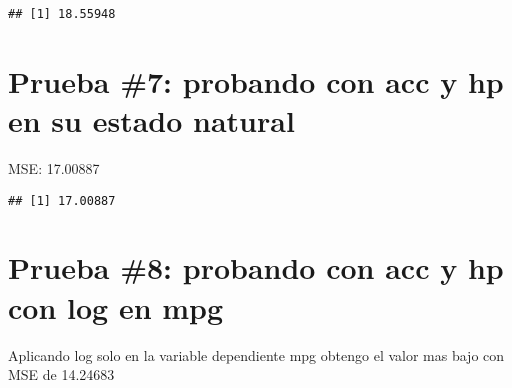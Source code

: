 \documentclass[]{article}
\newenvironment{Shaded}{\begin{snugshade}}{\end{snugshade}}
\newcommand{\CommentTok}[1]{\textcolor[rgb]{0.56,0.35,0.01}{\textit{#1}}}
\newcommand{\DataTypeTok}[1]{\textcolor[rgb]{0.13,0.29,0.53}{#1}}
\newcommand{\DecValTok}[1]{\textcolor[rgb]{0.00,0.00,0.81}{#1}}
\newcommand{\KeywordTok}[1]{\textcolor[rgb]{0.13,0.29,0.53}{\textbf{#1}}}
\newcommand{\NormalTok}[1]{#1}
\newcommand{\OperatorTok}[1]{\textcolor[rgb]{0.81,0.36,0.00}{\textbf{#1}}}
\newcommand{\StringTok}[1]{\textcolor[rgb]{0.31,0.60,0.02}{#1}}
\begin{document}
\begin{verbatim}
## [1] 18.55948
\end{verbatim}

\hypertarget{prueba-7-probando-con-acc-y-hp-en-su-estado-natural}{%
\section{Prueba \#7: probando con acc y hp en su estado
natural}\label{prueba-7-probando-con-acc-y-hp-en-su-estado-natural}}

MSE: 17.00887

\begin{Shaded}
\end{Shaded}

\begin{verbatim}
## [1] 17.00887
\end{verbatim}

\hypertarget{prueba-8-probando-con-acc-y-hp-con-log-en-mpg}{%
\section{Prueba \#8: probando con acc y hp con log en
mpg}\label{prueba-8-probando-con-acc-y-hp-con-log-en-mpg}}

Aplicando log solo en la variable dependiente mpg obtengo el valor mas
bajo con MSE de 14.24683
\end{document}
